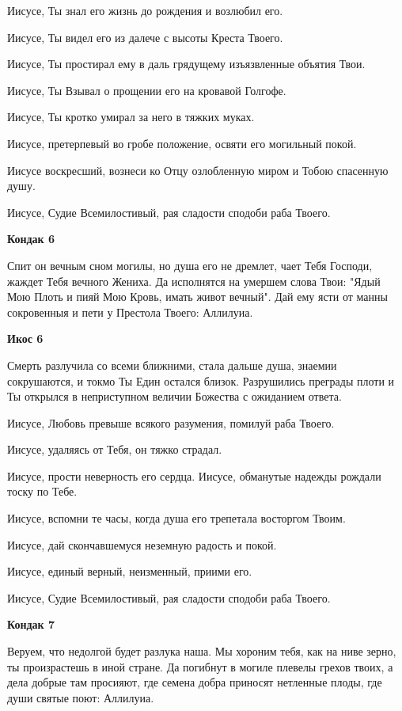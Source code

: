 Иисусе, Ты знал его жизнь до рождения и возлюбил его. 


Иисусе, Ты видел его из далече с высоты Креста Твоего. 


Иисусе, Ты простирал ему в даль грядущему изъязвленные объятия Твои. 


Иисусе, Ты Взывал о прощении его на кровавой Голгофе. 


Иисусе, Ты кротко умирал за него в тяжких муках. 


Иисусе, претерпевый во гробе положение, освяти его могильный покой. 


Иисусе воскресший, вознеси ко Отцу озлобленную миром и Тобою спасенную душу. 


Иисусе, Судие Всемилостивый, рая сладости сподоби раба Твоего.




\bfseries Кондак 6\normalfont{}


Спит он вечным сном могилы, но душа его не дремлет, чает Тебя Господи, жаждет Тебя вечного Жениха. Да исполнятся на умершем слова Твои: "Ядый Мою Плоть и пияй Мою Кровь, имать живот вечный". Дай ему ясти от манны сокровенныя и пети у Престола Твоего: Аллилуиа.




\bfseries Икос 6\normalfont{}


Смерть разлучила со всеми ближними, стала дальше душа, знаемии сокрушаются, и токмо Ты Един остался близок. Разрушились преграды плоти и Ты открылся в неприступном величии Божества с ожиданием ответа. 


Иисусе, Любовь превыше всякого разумения, помилуй раба Твоего. 


Иисусе, удаляясь от Тебя, он тяжко страдал. 


Иисусе, прости неверность его сердца. Иисусе, обманутые надежды рождали тоску по Тебе. 


Иисусе, вспомни те часы, когда душа его трепетала восторгом Твоим. 


Иисусе, дай скончавшемуся неземную радость и покой. 


Иисусе, единый верный, неизменный, приими его. 


Иисусе, Судие Всемилостивый, рая сладости сподоби раба Твоего.




\bfseries Кондак 7\normalfont{}


Веруем, что недолгой будет разлука наша. Мы хороним тебя, как на ниве зерно, ты произрастешь в иной стране. Да погибнут в могиле плевелы грехов твоих, а дела добрые там просияют, где семена добра приносят нетленные плоды, где души святые поют: Аллилуиа.




